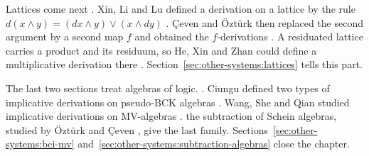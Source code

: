 Lattices come next \cite[Definition~3.1, p.~309]{XinLiLu2008}. Xin, Li and Lu
defined a derivation on a lattice by the rule $d(x \wedge y) = (dx \wedge y)
\vee (x \wedge dy)$ \cite[Definition~3.1, p.~309]{XinLiLu2008}. {\c{C}}even
and {\"O}zt{\"u}rk then replaced the second argument by a second map $f$ and
obtained the $f$-derivations \cite[Definition~8, p.~702]{CevenOzturk2008}. A
residuated lattice carries a product and its residuum, so He, Xin and Zhan
could define a multiplicative derivation there \cite[Definition~3.1,
p.~4]{HeXinZhan2016}. Section~\ref{sec:other-systems:lattices} tells this
part.

The last two sections treat algebras of logic.
\cite[Definition~3.5, p.~170]{JunXin2004}. Ciungu defined two types of
implicative derivations on pseudo-BCK algebras \cite[p.~178]{Ciungu2021}.
Wang, She and Qian studied implicative derivations on MV-algebras
\cite[Definition~3.1, p.~263]{WangSheQian2019}. the subtraction of Schein
algebras, studied by {\"O}zt{\"u}rk and {\c{C}}even \cite[Definition~3.1,
p.~511]{OzturkCeven2009}, give the last family.
Sections~\ref{sec:other-systems:bci-mv}
and~\ref{sec:other-systems:subtraction-algebras} close the chapter.
